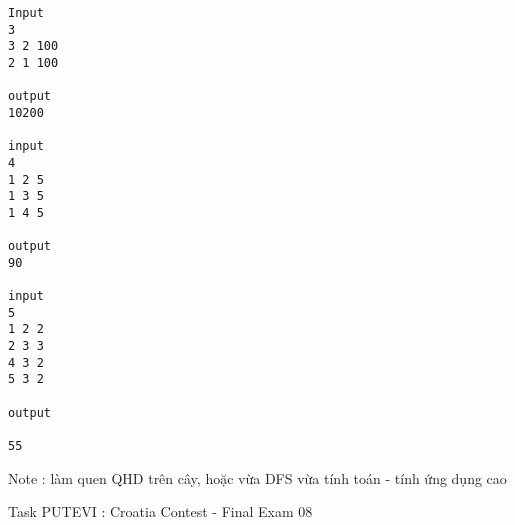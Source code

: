\begin{verbatim}
Input 
3 
3 2 100 
2 1 100 
 
output 
10200 

input 
4 
1 2 5 
1 3 5 
1 4 5 

output 
90 

input 
5 
1 2 2 
2 3 3 
4 3 2 
5 3 2 
 
output 
 
55
\end{verbatim}

Note : làm quen QHD trên cây, hoặc vừa DFS vừa tính toán - tính ứng dụng cao


Task PUTEVI : Croatia Contest - Final Exam 08